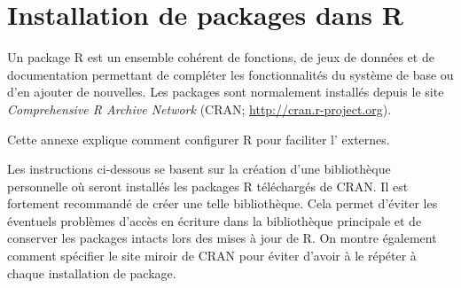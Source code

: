 \chapter{Installation de packages dans R}
\label{packages}

Un package R est un ensemble cohérent de fonctions, de jeux de données
et de documentation permettant de compléter les fonctionnalités du
système de base ou d'en ajouter de nouvelles. Les packages sont normalement
installés depuis le site \emph{Comprehensive R Archive Network} (CRAN;
\url{http://cran.r-project.org}).

Cette annexe explique comment configurer R pour faciliter l'%
externes.

Les instructions ci-dessous se basent sur la création d'une
bibliothèque personnelle où
seront installés les packages R téléchargés de CRAN. Il est fortement
recommandé de créer une telle bibliothèque. Cela permet d'éviter les
éventuels problèmes d'accès en écriture dans la bibliothèque
principale et de conserver les packages intacts lors des mises à jour
de R. On montre également comment spécifier le site miroir de CRAN
pour éviter d'avoir à le répéter à chaque installation de package.
